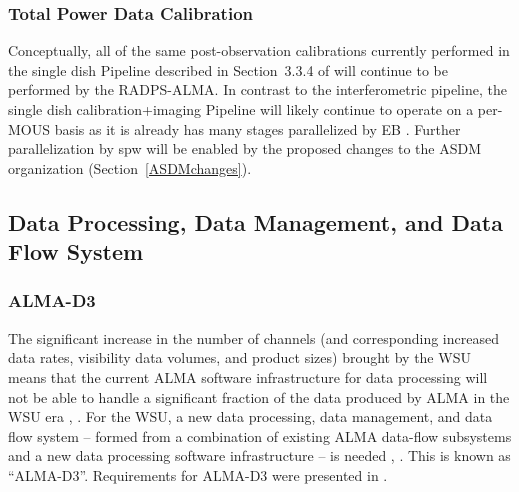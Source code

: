\subsubsection{Total Power Data Calibration}
Conceptually, all of the same post-observation calibrations currently performed in the single dish Pipeline described in Section~3.3.4 of \cite{CSA-IA} will continue to be performed by the RADPS-ALMA.  In contrast to the interferometric pipeline, the single dish calibration+imaging Pipeline will likely continue to operate on a per-MOUS basis as it is already has many stages parallelized by EB \cite{dp}.  Further parallelization by spw will be enabled by the proposed changes to the ASDM organization (Section~\ref{ASDMchanges}).


\subsection{Data Processing, Data Management, and Data Flow System}
\label{sec:dataProcessing}

\subsubsection{ALMA-D3}
\label{sec:alma-d3}

The significant increase in the number of channels (and corresponding increased data rates, visibility data volumes, and product sizes) brought by the WSU means that the current ALMA software infrastructure for data processing will not be able to handle a significant fraction of the data produced by ALMA in the WSU era \cite{dpda}, \cite{da}. For the WSU, a new data processing, data management, and data flow system -- formed from a combination of existing ALMA data-flow subsystems and a new data processing software infrastructure -- is needed \cite{dp}, \cite{cosdd_c}. This is known as ``ALMA-D3''. Requirements for ALMA-D3 were presented in \cite{dp}. 

